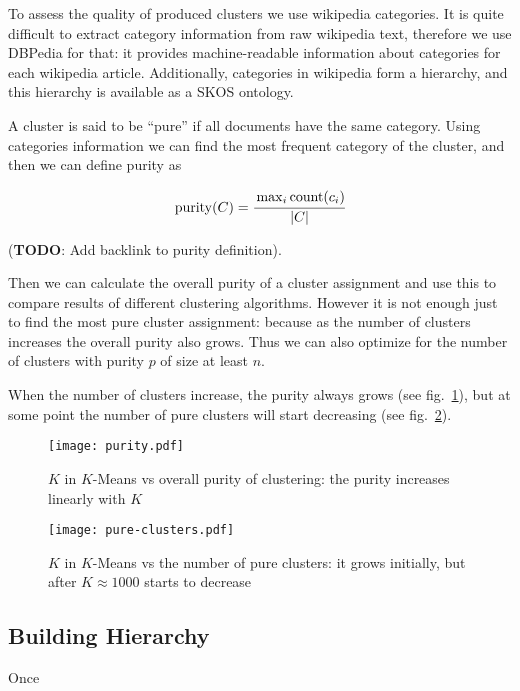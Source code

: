 To assess the quality of produced clusters we use wikipedia categories. It is 
quite difficult to extract category information from raw wikipedia text,
therefore we use DBPedia \cite{bizer2009dbpedia} for that: it provides 
machine-readable information about categories for each wikipedia article. 
Additionally, categories in wikipedia form a hierarchy, and this hierarchy 
is available as a SKOS ontology. 

A cluster is said to be ``pure'' if all documents have the same category. 
Using categories information we can find the most frequent category of the 
cluster, and then we can define purity as 

$$\operatorname{purity}(C) = \cfrac{\max_i \operatorname{count}(c_i)}{|C|}$$

(\textbf{TODO}: Add backlink to purity definition). 

Then we can calculate the overall purity of a cluster assignment and use 
this to compare results of different clustering algorithms. However it is not 
enough just to find the most pure cluster assignment: because as the number 
of clusters increases the overall purity also grows. 
Thus we can also optimize for the number of clusters with purity $p$ of 
size at least $n$. 

When the number of clusters increase, the purity always grows 
(see fig.~\ref{fig:k-vs-purity}), but at some point the number of pure clusters 
will start decreasing (see fig.~\ref{fig:k-vs-pureclusters}).


\begin{figure}[h]
\centering\texttt{[image: purity.pdf]}
\caption{$K$ in $K$-Means vs overall purity of clustering: the purity increases linearly with $K$}
\label{fig:k-vs-purity}
\end{figure}


\begin{figure}[h]
\centering\texttt{[image: pure-clusters.pdf]}
\caption{$K$ in $K$-Means vs the number of pure clusters: it grows initially, but after $K\approx 1000$ starts to decrease}
\label{fig:k-vs-pureclusters}
\end{figure}




\subsection{Building Hierarchy} \label{sec:hierarchy}


Once 

